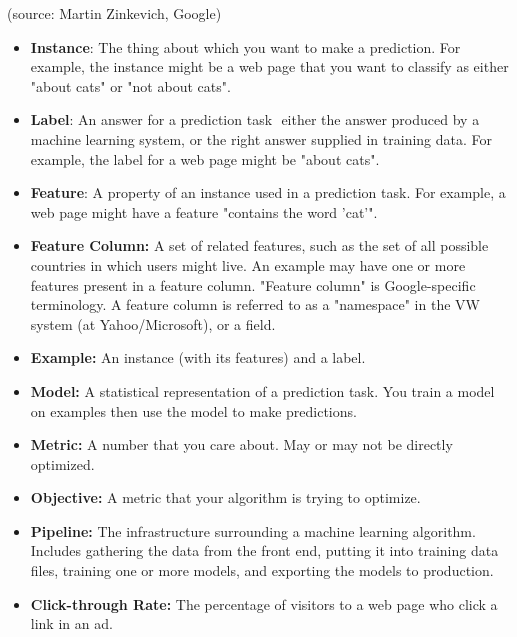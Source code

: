 
\usepackage{epsfig}





(source: Martin Zinkevich, Google)


\begin{itemize}
\item \textbf{Instance}: The thing about which you want to make a
  prediction. For example, the instance might be a web page that you
  want to classify as either "about cats" or "not about cats".
\item \textbf{Label}: An answer for a prediction task ­­ either the
  answer produced by a machine learning system, or the right answer
  supplied in training data. For example, the label for a web page
  might be "about cats".
\item \textbf{Feature}: A property of an instance used in a prediction
  task. For example, a web page might have a feature "contains the
  word 'cat'".
\item \textbf{Feature Column:} A set of related features, such as the
  set of all possible countries in which users might live. An example
  may have one or more features present in a feature column. "Feature
  column" is Google-specific terminology. A feature column is referred
  to as a "namespace" in the VW system (at Yahoo/Microsoft), or a
  field.
\item \textbf{Example:} An instance (with its features) and a label.
\item \textbf{Model:} A statistical representation of a prediction
  task. You train a model on examples then use the model to make
  predictions.
\item \textbf{Metric:} A number that you care about. May or may not be
  directly optimized.
\item \textbf{Objective:} A metric that your algorithm is trying to optimize.
\item \textbf{Pipeline:} The infrastructure surrounding a machine
  learning algorithm. Includes gathering the data from the front end,
  putting it into training data files, training one or more models,
  and exporting the models to production.
\item \textbf{Click-through Rate:} The percentage of visitors to a web
    page who click a link in an ad.
\end{itemize}


